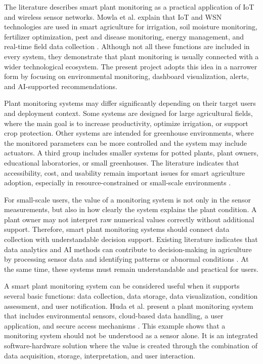 The literature describes smart plant monitoring as a practical application of IoT and wireless sensor networks. Mowla et al. explain that IoT and WSN technologies are used in smart agriculture for irrigation, soil moisture monitoring, fertilizer optimization, pest and disease monitoring, energy management, and real-time field data collection \cite{mowla2023iot}. Although not all these functions are included in every system, they demonstrate that plant monitoring is usually connected with a wider technological ecosystem. The present project adopts this idea in a narrower form by focusing on environmental monitoring, dashboard visualization, alerts, and AI-supported recommendations.

Plant monitoring systems may differ significantly depending on their target users and deployment context. Some systems are designed for large agricultural fields, where the main goal is to increase productivity, optimize irrigation, or support crop protection. Other systems are intended for greenhouse environments, where the monitored parameters can be more controlled and the system may include actuators. A third group includes smaller systems for potted plants, plant owners, educational laboratories, or small greenhouses. The literature indicates that accessibility, cost, and usability remain important issues for smart agriculture adoption, especially in resource-constrained or small-scale environments \cite{miller2025iot,nawaz2025iot}.

For small-scale users, the value of a monitoring system is not only in the sensor measurements, but also in how clearly the system explains the plant condition. A plant owner may not interpret raw numerical values correctly without additional support. Therefore, smart plant monitoring systems should connect data collection with understandable decision support. Existing literature indicates that data analytics and AI methods can contribute to decision-making in agriculture by processing sensor data and identifying patterns or abnormal conditions \cite{mansoor2025integration,miller2025iot}. At the same time, these systems must remain understandable and practical for users.

A smart plant monitoring system can be considered useful when it supports several basic functions: data collection, data storage, data visualization, condition assessment, and user notification. Huda et al. present a plant monitoring system that includes environmental sensors, cloud-based data handling, a user application, and secure access mechanisms \cite{huda2024iot}. This example shows that a monitoring system should not be understood as a sensor alone. It is an integrated software-hardware solution where the value is created through the combination of data acquisition, storage, interpretation, and user interaction.


